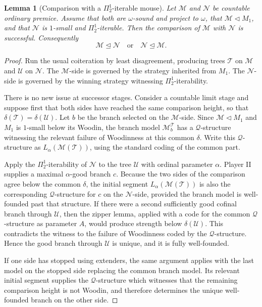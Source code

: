 \documentclass[a4paper,11pt]{article}
\newtheorem{lemma}[theorem]{Lemma}
\begin{document}
\begin{lemma}[Comparison with a $\Pi^1_2$-iterable mouse]\label{lem:local-comparison-m1}
Let $\mathcal M$ and $\mathcal N$ be countable ordinary premice.  Assume that both are $\omega$-sound and project to $\omega$, that $\mathcal M\triangleleft M_1$, and that $\mathcal N$ is $1$-small and $\Pi^1_2$-iterable.  Then the comparison of $\mathcal M$ with $\mathcal N$ is successful.  Consequently
\[
   \mathcal M\trianglelefteq\mathcal N
   \quad\text{or}\quad
   \mathcal N\trianglelefteq\mathcal M.
\]
\end{lemma}

\begin{proof}
Run the usual coiteration by least disagreement, producing trees $\mathcal T$ on $\mathcal M$ and $\mathcal U$ on $\mathcal N$.  The $\mathcal M$-side is governed by the strategy inherited from $M_1$.  The $\mathcal N$-side is governed by the winning strategy witnessing $\Pi^1_2$-iterability.

There is no new issue at successor stages.  Consider a countable limit stage and suppose first that both sides have reached the same comparison height, so that $\delta(\mathcal T)=\delta(\mathcal U)$.  Let $b$ be the branch selected on the $\mathcal M$-side.  Since $\mathcal M\triangleleft M_1$ and $M_1$ is $1$-small below its Woodin, the branch model $\mathcal M_b^{\mathcal T}$ has a $\mathcal Q$-structure witnessing the relevant failure of Woodinness at this common $\delta$.  Write this $\mathcal Q$-structure as $L_\alpha(\mathcal M(\mathcal T))$, using the standard coding of the common part.

Apply the $\Pi^1_2$-iterability of $\mathcal N$ to the tree $\mathcal U$ with ordinal parameter $\alpha$.  Player II supplies a maximal $\alpha$-good branch $c$.  Because the two sides of the comparison agree below the common $\delta$, the initial segment $L_\alpha(\mathcal M(\mathcal T))$ is also the corresponding $\mathcal Q$-structure for $c$ on the $\mathcal N$-side, provided the branch model is well-founded past that structure.  If there were a second sufficiently good cofinal branch through $\mathcal U$, then the zipper lemma, applied with a code for the common $\mathcal Q$-structure as parameter $A$, would produce strength below $\delta(\mathcal U)$.  This contradicts the witness to the failure of Woodinness coded by the $\mathcal Q$-structure.  Hence the good branch through $\mathcal U$ is unique, and it is fully well-founded.

If one side has stopped using extenders, the same argument applies with the last model on the stopped side replacing the common branch model.  Its relevant initial segment supplies the $\mathcal Q$-structure which witnesses that the remaining comparison height is not Woodin, and therefore determines the unique well-founded branch on the other side.


\end{proof}
\end{document}

